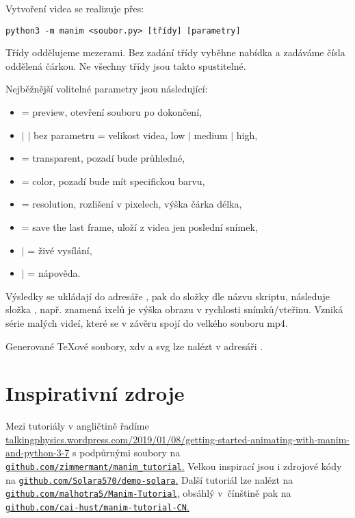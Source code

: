Vytvoření videa se realizuje přes:%
\smallskip

\hfil \texttt{python3 -m manim <soubor.py> [třídy] [parametry]}%
\smallskip

Třídy oddělujeme mezerami. Bez zadání třídy vyběhne nabídka a zadáváme čísla oddělená čárkou. Ne všechny třídy jsou takto spustitelné.

Nejběžnější volitelné parametry jsou následující:

\begin{itemize}
\itemsep=-2pt
\item {} = preview, otevření souboru po dokončení,
\item {} $|$  $|$ bez parametru = velikost videa, low $|$ medium $|$ high,
\item {} = transparent, pozadí bude průhledné,
\item {} = color, pozadí bude mít specifickou barvu,
\item {} = resolution, rozlišení v pixelech, výška čárka délka,
\item {} = save the last frame, uloží z videa jen poslední snímek,
\item {} $|$  = živé vysílání,
\item {} $|$  = nápověda.
\end{itemize}

Výsledky se ukládají do adresáře , pak do složky dle názvu skriptu, následuje složka , např.  znamená  ixelů je výška obrazu v rychlosti  snímků/vteřinu. Vzniká série malých videí, které se v závěru spojí do velkého souboru mp4.

Generované \TeX ové soubory, xdv a svg lze nalézt v adresáři .


\section{Inspirativní zdroje}

Mezi tutoriály v angličtině řadíme 
\href{https://talkingphysics.wordpress.com/2019/01/08/getting-started-animating-with-manim-and-python-3-7/}{\url{talkingphysics.wordpress.com/2019/01/08/getting-started-animating-with-manim-and-python-3-7}} s podpůrnými soubory na 
\href{https://github.com/zimmermant/manim_tutorial}{\texttt{github.com/zimmermant/manim\_tutorial}.} Velkou inspirací jsou i zdrojové kódy na 
\href{https://github.com/Solara570/demo-solara}{\texttt{github.com/Solara570/demo-solara}.} Dal\-ší tutoriál lze nalézt na 
\href{https://github.com/malhotra5/Manim-Tutorial}{\texttt{github.com/malhotra5/Manim-Tutorial},} obsáhlý v~čínštině pak na 
\href{https://github.com/cai-hust/manim-tutorial-CN}{\texttt{github.com/cai-hust/manim-tutorial-CN}.}

